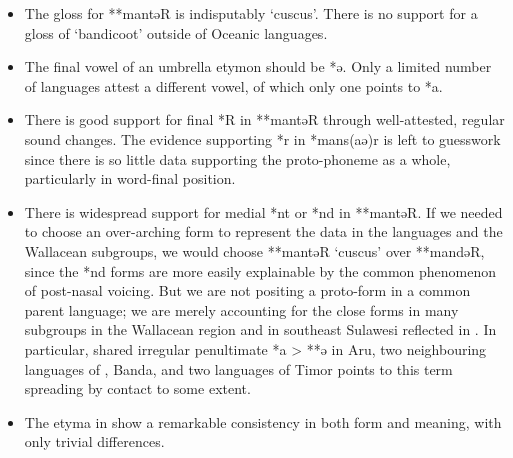 \begin{itemize}
		\item	The gloss for **mantəR is indisputably ‘cuscus’.
					There is no support for a gloss of ‘bandicoot’ outside of Oceanic languages.
		\item	The final vowel of an umbrella etymon should be *ə.
					Only a limited number of  languages attest a
					different vowel, of which only one points to *a.
		\item	There is good support for final *R in **mantəR through
					well-attested, regular sound changes.
					The evidence supporting *r in *mans(aə)r is left to guesswork
					since there is so little data supporting the proto-phoneme as
					a whole, particularly in word-final position.
		\item	There is widespread support for medial *nt or *nd in **mantəR.
					If we needed to choose an over-arching form to represent the
					data in the  languages
					and the Wallacean subgroups,
					we would choose **mantəR ‘cuscus’ over **mandəR,
					since the *nd forms are more easily explainable by the common
					phenomenon of post-nasal voicing.
					But we are not positing a proto-form in a common parent language;
					we are merely accounting for the close forms in many subgroups
					in the Wallacean region
					and in southeast Sulawesi reflected in .
					In particular, shared irregular penultimate *a > **ə in Aru,
					two neighbouring languages of ,
					Banda, and two languages of Timor points to this term spreading
					by contact to some extent.
		\item	The etyma in  show a remarkable consistency
					in both form and meaning, with only trivial differences.
\end{itemize}